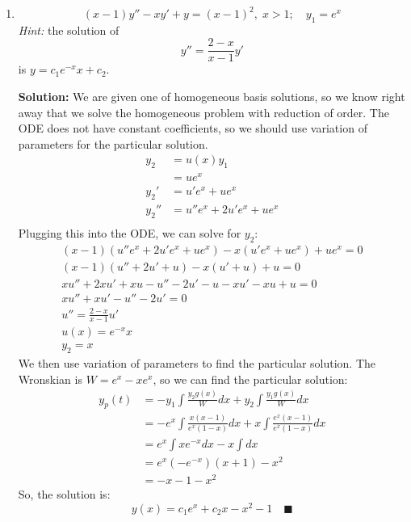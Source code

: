 \documentclass[letterpaper, fontsize=10pt]{scrartcl} %
\numberwithin{equation}{section} %
\numberwithin{figure}{section} %
\numberwithin{table}{section} %
\begin{document}
\begin{enumerate}
\begin{enumerate}[label=(\alph*)]
\item 
\[ (x-1)y'' -xy' +y=(x-1)^2, \; x> 1; \quad y_1 = e^x \]
\textit{Hint:} the solution of \[y'' = \frac{2-x}{x-1}y'\]
is $y = c_1 e^{-x} x + c_2$. 
\par \textbf{Solution:} We are given one of homogeneous basis solutions, so we know right away that we solve the homogeneous problem with reduction of order. The ODE does not have constant coefficients, so we should use variation of parameters for the particular solution.
\begin{align*}
y_2 &= u(x) y_1\\
&= ue^x\\
y_2' &= u'e^x + ue^x\\
y_2'' &= u''e^x + 2u'e^x + ue^x \\
\end{align*}
Plugging this into the ODE, we can solve for $y_2$:
\begin{gather*}
(x-1)(u''e^x + 2u'e^x + ue^x) - x(u'e^x + ue^x) + ue^x = 0\\
(x-1)(u'' + 2u' + u) - x(u' + u) + u = 0\\
xu'' + 2xu' + xu - u'' - 2u' - u -xu' - xu + u = 0\\
xu'' + xu' - u'' - 2u'  = 0\\
u'' = \frac{2-x}{x-1}u' \\
u(x) = e^{-x}x\\
y_2 = x
\end{gather*}
We then use variation of parameters to find the particular solution. The Wronskian is $W = e^x - xe^x$, so we can find the particular solution:
\begin{align*}
y_p(t) &= -y_1 \int \frac{y_2 g(x)}{W}dx + y_2 \int \frac{y_1 g(x)}{W}dx  \\
&= -e^x \int \frac{x (x-1)}{e^x(1-x)}dx + x \int \frac{e^x (x-1)}{e^x(1-x)}dx \\
&= e^x  \int xe^{-x} dx - x \int dx \\
&= e^x (-e^{-x})(x+1) - x^2\\
&= -x -1 -x^2
\end{align*}
So, the solution is:
\[ y(x) = c_1 e^x + c_2 x -x^2 - 1 \quad\blacksquare\]


\end{enumerate}
\end{enumerate}
\end{document}
